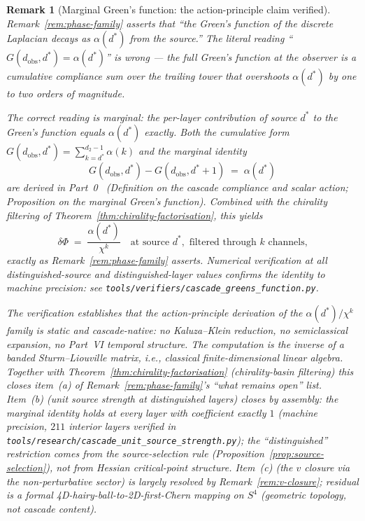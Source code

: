 \documentclass[12pt,a4paper]{article}
\newtheorem*{remark}{Remark}
\begin{document}
\begin{remark}[Marginal Green's function: the action-principle claim verified]
\label{rem:marginal-greens}
Remark~\ref{rem:phase-family} asserts that \emph{``the Green's function of the
discrete Laplacian decays as $\alpha(d^*)$ from the source.''} The literal reading
``$G(d_{\mathrm{obs}}, d^*) = \alpha(d^*)$'' is wrong --- the full Green's function
at the observer is a cumulative compliance sum over the trailing tower that
overshoots $\alpha(d^*)$ by one to two orders of magnitude.

The correct reading is \emph{marginal}: the per-layer contribution of source
$d^*$ to the Green's function equals $\alpha(d^*)$ exactly. Both the
cumulative form $G(d_{\mathrm{obs}}, d^*) = \sum_{k=d^*}^{d_2-1}\alpha(k)$ and
the marginal identity
\begin{equation}
\label{eq:marginal-greens}
\boxed{\;G(d_{\mathrm{obs}}, d^*) - G(d_{\mathrm{obs}}, d^* + 1) \;=\; \alpha(d^*)\;}
\end{equation}
are derived in Part~0~\cite{part0} (Definition on the cascade
compliance and scalar action; Proposition on the marginal Green's function).
Combined with the chirality filtering of Theorem~\ref{thm:chirality-factorisation},
this yields
\[
\delta\Phi \;=\; \frac{\alpha(d^*)}{\chi^k}
\quad\text{at source }d^*,\text{ filtered through }k\text{ channels,}
\]
exactly as Remark~\ref{rem:phase-family} asserts. Numerical verification at
all distinguished-source and distinguished-layer values confirms the identity
to machine precision: see \texttt{tools/verifiers/cascade\_greens\_function.py}.

The verification establishes that the action-principle derivation of the
$\alpha(d^*)/\chi^k$ family is static and cascade-native: no Kaluza--Klein
reduction, no semiclassical expansion, no Part~VI temporal structure. The
computation is the inverse of a banded Sturm--Liouville matrix, i.e., classical
finite-dimensional linear algebra. Together with Theorem~\ref{thm:chirality-factorisation}
(chirality-basin filtering) this closes item~(a) of Remark~\ref{rem:phase-family}'s
``what remains open'' list. Item~(b) (unit source strength at distinguished
layers) closes by assembly: the marginal identity holds at every layer with
coefficient exactly $1$ (machine precision, $211$ interior layers verified
in \texttt{tools/research/cascade\_unit\_source\_strength.py}); the
``distinguished'' restriction comes from the source-selection rule
(Proposition~\ref{prop:source-selection}), not from Hessian critical-point
structure. Item~(c) (the $v$ closure via the non-perturbative sector) is
largely resolved by Remark~\ref{rem:v-closure}; residual is a formal
4D-hairy-ball-to-2D-first-Chern mapping on $S^4$ (geometric topology, not
cascade content).


\end{remark}
\end{document}
